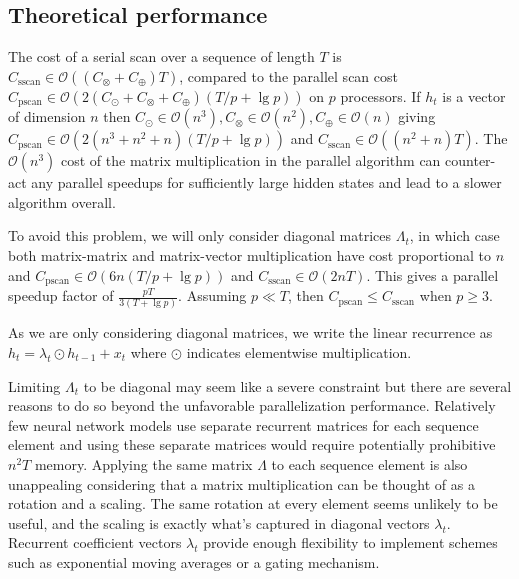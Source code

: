 \documentclass{article}
\begin{document}
\subsection{Theoretical performance}
The cost of a serial scan over a sequence of length $T$ is
$C_\text{sscan} \in \mathcal{O}((C_\otimes + C_\oplus)T)$, compared to the parallel scan cost
$C_\text{pscan} \in \mathcal{O}(2(C_\odot + C_\otimes + C_\oplus)(T/p + \lg p))$ \cite{blelloch1990prefix} on $p$ processors.
If $h_t$ is a vector of dimension $n$ then
$C_\odot \in  \mathcal{O}(n^3), C_\otimes \in \mathcal{O}(n^2), C_\oplus \in \mathcal{O}(n)$ giving
$C_\text{pscan} \in \mathcal{O}(2(n^3 + n^2 + n)(T/p + \lg p))$ and
$C_\text{sscan} \in \mathcal{O}((n^2 + n)T)$. The $\mathcal{O}(n^3)$ cost of the matrix
multiplication in the parallel algorithm can counter-act any parallel speedups for
sufficiently large hidden states and lead to a slower algorithm overall.

To avoid this problem, we will only consider diagonal matrices $\Lambda_t$, in
which case both matrix-matrix and matrix-vector multiplication have cost
proportional to $n$ and $C_\text{pscan}\in \mathcal{O}(6n(T/p + \lg p))$ and
$C_\text{sscan} \in \mathcal{O}(2nT)$. This gives a parallel speedup factor of
$\frac{pT}{3(T+\lg p)}$. Assuming $p \ll T$, then $C_\text{pscan} \le
C_\text{sscan}$ when $p \ge 3$.

As we are only considering diagonal matrices,
we write the linear recurrence as $h_t = \lambda_t \odot h_{t-1} + x_t$
where $\odot$ indicates elementwise multiplication.

Limiting $\Lambda_t$ to be diagonal may seem like a severe constraint but there are
several reasons to do so beyond the unfavorable parallelization performance. Relatively few neural
network models use separate recurrent matrices for each sequence element and using these
separate matrices would require potentially prohibitive $n^2T$ memory.
Applying
the same matrix $\Lambda$ to each sequence element is also unappealing considering that a matrix
multiplication can be thought of as a rotation and a scaling. The same rotation at every
element seems unlikely to be useful, and the scaling is exactly what's captured in diagonal
vectors $\lambda_t$. Recurrent coefficient vectors $\lambda_t$ provide enough flexibility
to implement schemes such as exponential moving averages or a gating mechanism.
\end{document}
